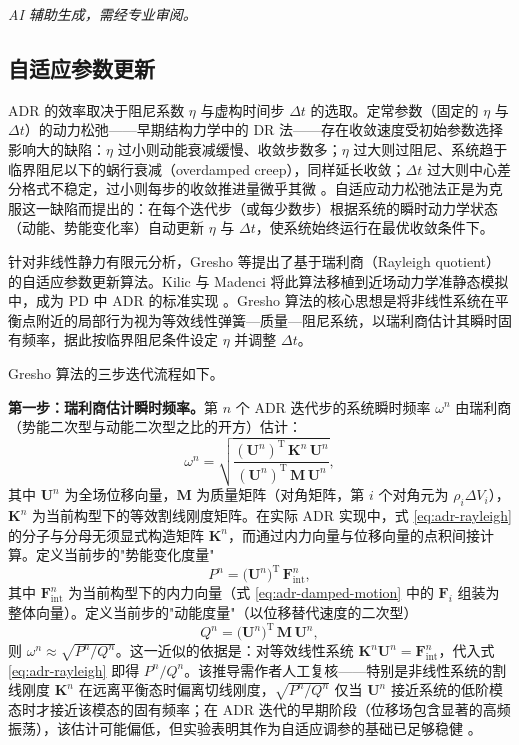 \emph{AI 辅助生成，需经专业审阅。}

\subsection{自适应参数更新}\label{sec:adr-gresho}

ADR 的效率取决于阻尼系数 $\eta$ 与虚构时间步 $\Delta t$ 的选取。定常参数（固定的 $\eta$ 与 $\Delta t$）的动力松弛——早期结构力学中的 DR 法——存在收敛速度受初始参数选择影响大的缺陷：$\eta$ 过小则动能衰减缓慢、收敛步数多；$\eta$ 过大则过阻尼、系统趋于临界阻尼以下的蜗行衰减（overdamped creep），同样延长收敛；$\Delta t$ 过大则中心差分格式不稳定，过小则每步的收敛推进量微乎其微 \cite{KilicMadenci2010}。自适应动力松弛法正是为克服这一缺陷而提出的：在每个迭代步（或每少数步）根据系统的瞬时动力学状态（动能、势能变化率）自动更新 $\eta$ 与 $\Delta t$，使系统始终运行在最优收敛条件下。

针对非线性静力有限元分析，Gresho 等提出了基于瑞利商（Rayleigh quotient）的自适应参数更新算法。Kilic 与 Madenci \cite{KilicMadenci2010} 将此算法移植到近场动力学准静态模拟中，成为 PD 中 ADR 的标准实现 \cite{MadenciOterkus2014,MadenciOterkus2016}。Gresho 算法的核心思想是将非线性系统在平衡点附近的局部行为视为等效线性弹簧—质量—阻尼系统，以瑞利商估计其瞬时固有频率，据此按临界阻尼条件设定 $\eta$ 并调整 $\Delta t$。

Gresho 算法的三步迭代流程如下。

\textbf{第一步：瑞利商估计瞬时频率。}第 $n$ 个 ADR 迭代步的系统瞬时频率 $\omega^{n}$ 由瑞利商（势能二次型与动能二次型之比的开方）估计：
\begin{equation}
  \omega^{n}
  =\sqrt{\frac{(\mathbf{U}^{n})^{\mathrm{T}}\,\mathbf{K}^{n}\,\mathbf{U}^{n}}
  {(\mathbf{U}^{n})^{\mathrm{T}}\,\mathbf{M}\,\mathbf{U}^{n}}},
  \label{eq:adr-rayleigh}
\end{equation}
其中 $\mathbf{U}^{n}$ 为全场位移向量，$\mathbf{M}$ 为质量矩阵（对角矩阵，第 $i$ 个对角元为 $\rho_i\Delta V_i$），$\mathbf{K}^{n}$ 为当前构型下的等效割线刚度矩阵。在实际 ADR 实现中，式 \eqref{eq:adr-rayleigh} 的分子与分母无须显式构造矩阵 $\mathbf{K}^{n}$，而通过内力向量与位移向量的点积间接计算。定义当前步的"势能变化度量"
\begin{equation}
  P^{n}
  =\bigl(\mathbf{U}^{n}\bigr)^{\mathrm{T}}\,\mathbf{F}_{\mathrm{int}}^{n},
  \label{eq:adr-potential-measure}
\end{equation}
其中 $\mathbf{F}_{\mathrm{int}}^{n}$ 为当前构型下的内力向量（式 \eqref{eq:adr-damped-motion} 中的 $\mathbf{F}_i$ 组装为整体向量）。定义当前步的"动能度量"（以位移替代速度的二次型）
\begin{equation}
  Q^{n}
  =\bigl(\mathbf{U}^{n}\bigr)^{\mathrm{T}}\,\mathbf{M}\,\mathbf{U}^{n},
  \label{eq:adr-mass-measure}
\end{equation}
则 $\omega^{n}\approx\sqrt{P^{n}/Q^{n}}$。这一近似的依据是：对等效线性系统 $\mathbf{K}^{n}\mathbf{U}^{n}=\mathbf{F}_{\mathrm{int}}^{n}$，代入式 \eqref{eq:adr-rayleigh} 即得 $P^{n}/Q^{n}$。该推导需作者人工复核——特别是非线性系统的割线刚度 $\mathbf{K}^{n}$ 在远离平衡态时偏离切线刚度，$\sqrt{P^{n}/Q^{n}}$ 仅当 $\mathbf{U}^{n}$ 接近系统的低阶模态时才接近该模态的固有频率；在 ADR 迭代的早期阶段（位移场包含显著的高频振荡），该估计可能偏低，但实验表明其作为自适应调参的基础已足够稳健 \cite{KilicMadenci2010}。

